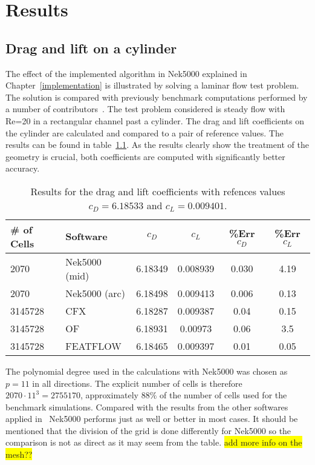 
\chapter{Results} %

\label{results} %



\section{Drag and lift on a cylinder}
The effect of the implemented algorithm in Nek5000 explained in Chapter~\ref{implementation} is
illustrated by solving a laminar flow test problem. 
The solution is compared with previously benchmark computations performed by a number of 
contributors~\cite{benchmark}. The test problem considered is steady flow with Re=20 in 
a rectangular channel past a cylinder. The drag and lift coefficients on the cylinder 
are calculated and compared to a pair of reference values. The results can be found in 
table~\ref{tab:testcase}. As the results clearly show the treatment of the geometry is 
crucial, both coefficients are computed with significantly better accuracy. 
%
\begin{table}
\centering
\begin{tabular}{l l c c c c}
		\toprule
		\# of Cells & Software & $c_D$ & $c_L$ & \%\textbf{Err} $c_D$ &\%\textbf{Err} $c_L$ \\ \midrule 
		2070 & Nek5000 (mid) & 6.18349 & 0.008939 & 0.030 & 4.19 \\ 
		2070 & Nek5000 (arc) & 6.18498 & 0.009413 & 0.006 & 0.13 \\
		3145728 & CFX 		 & 6.18287 & 0.009387 & 0.04 &0.15 \\
		3145728 & OF	     & 6.18931 & 0.00973 & 0.06 &3.5 \\
		3145728 & FEATFLOW   & 6.18465 & 0.009397 & 0.01 &0.05 \\
		\bottomrule	
	\end{tabular}
	\caption{Results for the drag and lift coefficients with refences values 
	$c_D = 6.18533$ and $c_L = 0.009401$.}
\label{tab:testcase}
\end{table}
%
The polynomial degree used in the calculations with Nek5000 was chosen as $p = 11 $ 
in all directions. The explicit number of cells is therefore $2070\cdot11^{3} = 2755170$,
approximately $88\%$ of the number of cells used for the benchmark simulations. Compared 
with the results from the other softwares applied in~\cite{benchmark} Nek5000 performs 
just as well or better in most cases. It should be mentioned that the division of the grid is done 
differently for Nek5000 so the comparison is not as direct as it may seem from the table.
\colorbox{yellow}{add more info on the mesh??}

